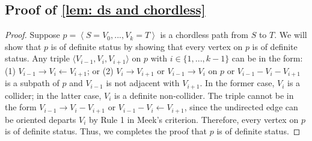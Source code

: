 \documentclass{article}
\begin{document}

\subsection{Proof of \cref{lem: ds and chordless}}
\label{proof_lem: ds and chordless}
\begin{proof}
    Suppose $p = \left \langle S=V_0,...,V_k = T \right \rangle$ is a chordless path from $S$ to $T$. We will show that $p$ is of definite status by showing that every vertex on $p$ is of definite status. Any triple $\langle V_{i-1}, V_{i}, V_{i+1} \rangle $ on $p$ with $i \in \{1,...,k-1\}$ can be in the form: (1) $V_{i-1} \rightarrow V_{i} \leftarrow V_{i+1}$; or (2) $V_{i}\rightarrow V_{i+1}$ or $V_{i-1}\rightarrow V_{i}$ on $p$ or $V_{i-1} - V_{i} - V_{i+1}$ is a subpath of $p$ and $V_{i-1}$ is not adjacent with $V_{i+1}$. In the former case, $V_{i}$ is a collider; in the latter case, $V_{i}$ is a definite non-collider. The triple cannot be in the form $V_{i-1} \rightarrow V_{i} - V_{i+1}$ or $V_{i-1} - V_{i} \leftarrow V_{i+1}$, since the undirected edge can be oriented departs $V_{i}$ by Rule 1 in Meek's criterion. Therefore, every vertex on $p$ is of definite status. Thus, we completes the proof that $p$ is of definite status.
\end{proof}
\end{document}
